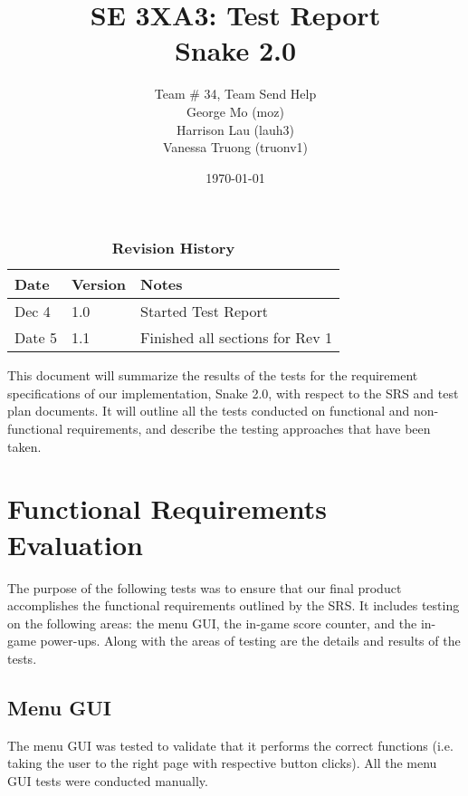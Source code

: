 \documentclass[12pt, titlepage]{article}
\title{SE 3XA3: Test Report\\Snake 2.0}
\author{Team \# 34, Team Send Help
		\\ George Mo (moz)
		\\ Harrison Lau (lauh3)
		\\ Vanessa Truong (truonv1)
}
\date{\today}
\begin{document}
\maketitle

\tableofcontents
\listoftables
\listoffigures

\begin{table}[bp]
\caption{\bf Revision History}
\begin{tabularx}{\textwidth}{p{3cm}p{2cm}X}
\toprule {\bf Date} & {\bf Version} & {\bf Notes}\\
\midrule
Dec 4 & 1.0 & Started Test Report\\
Date 5 & 1.1 & Finished all sections for Rev 1\\
\bottomrule
\end{tabularx}
\end{table}

\newpage


This document will summarize the results of the tests for the requirement specifications of our implementation, Snake 2.0, with respect to the SRS and test plan documents. It will outline all the tests conducted on functional and non-functional requirements, and describe the testing approaches that have been taken.

\section{Functional Requirements Evaluation}
The purpose of the following tests was to ensure that our final product accomplishes the functional requirements outlined by the SRS. It includes testing on the following areas: the menu GUI, the in-game score counter, and the in-game power-ups. Along with the areas of testing are the details and results of the tests.

\subsection{Menu GUI}
The menu GUI was tested to validate that it performs the correct functions (i.e. taking the user to the right page with respective button clicks). All the menu GUI tests were conducted manually.
\end{document}
